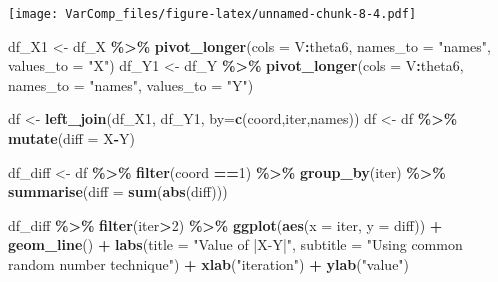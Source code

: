 \documentclass[
]{article}
\newenvironment{Shaded}{\begin{snugshade}}{\end{snugshade}}
\newcommand{\AttributeTok}[1]{\textcolor[rgb]{0.13,0.29,0.53}{#1}}
\newcommand{\DecValTok}[1]{\textcolor[rgb]{0.00,0.00,0.81}{#1}}
\newcommand{\FunctionTok}[1]{\textcolor[rgb]{0.13,0.29,0.53}{\textbf{#1}}}
\newcommand{\NormalTok}[1]{#1}
\newcommand{\OtherTok}[1]{\textcolor[rgb]{0.56,0.35,0.01}{#1}}
\newcommand{\SpecialCharTok}[1]{\textcolor[rgb]{0.81,0.36,0.00}{\textbf{#1}}}
\newcommand{\StringTok}[1]{\textcolor[rgb]{0.31,0.60,0.02}{#1}}
\begin{document}
\texttt{[image: VarComp\_files/figure-latex/unnamed-chunk-8-4.pdf]}

\begin{Shaded}
\begin{Highlighting}[]
\NormalTok{df\_X1 }\OtherTok{\textless{}{-}}\NormalTok{ df\_X }\SpecialCharTok{\%\textgreater{}\%} \FunctionTok{pivot\_longer}\NormalTok{(}\AttributeTok{cols =}\NormalTok{ V}\SpecialCharTok{:}\NormalTok{theta6, }\AttributeTok{names\_to =} \StringTok{"names"}\NormalTok{, }\AttributeTok{values\_to =} \StringTok{"X"}\NormalTok{)}
\NormalTok{df\_Y1 }\OtherTok{\textless{}{-}}\NormalTok{ df\_Y }\SpecialCharTok{\%\textgreater{}\%} \FunctionTok{pivot\_longer}\NormalTok{(}\AttributeTok{cols =}\NormalTok{ V}\SpecialCharTok{:}\NormalTok{theta6, }\AttributeTok{names\_to =} \StringTok{"names"}\NormalTok{, }\AttributeTok{values\_to =} \StringTok{"Y"}\NormalTok{)}

\NormalTok{df }\OtherTok{\textless{}{-}} \FunctionTok{left\_join}\NormalTok{(df\_X1, df\_Y1, }\AttributeTok{by=}\FunctionTok{c}\NormalTok{(}\StringTok{\textquotesingle{}coord\textquotesingle{}}\NormalTok{,}\StringTok{\textquotesingle{}iter\textquotesingle{}}\NormalTok{,}\StringTok{\textquotesingle{}names\textquotesingle{}}\NormalTok{))}
\NormalTok{df }\OtherTok{\textless{}{-}}\NormalTok{ df }\SpecialCharTok{\%\textgreater{}\%} \FunctionTok{mutate}\NormalTok{(}\AttributeTok{diff =}\NormalTok{ X}\SpecialCharTok{{-}}\NormalTok{Y)}

\NormalTok{df\_diff }\OtherTok{\textless{}{-}}\NormalTok{ df }\SpecialCharTok{\%\textgreater{}\%}
  \FunctionTok{filter}\NormalTok{(coord }\SpecialCharTok{==}\DecValTok{1}\NormalTok{) }\SpecialCharTok{\%\textgreater{}\%}
  \FunctionTok{group\_by}\NormalTok{(iter) }\SpecialCharTok{\%\textgreater{}\%}
  \FunctionTok{summarise}\NormalTok{(}\AttributeTok{diff =} \FunctionTok{sum}\NormalTok{(}\FunctionTok{abs}\NormalTok{(diff)))}
\end{Highlighting}
\end{Shaded}

\begin{Shaded}
\begin{Highlighting}[]
\NormalTok{df\_diff }\SpecialCharTok{\%\textgreater{}\%}
  \FunctionTok{filter}\NormalTok{(iter}\SpecialCharTok{\textgreater{}}\DecValTok{2}\NormalTok{) }\SpecialCharTok{\%\textgreater{}\%}
  \FunctionTok{ggplot}\NormalTok{(}\FunctionTok{aes}\NormalTok{(}\AttributeTok{x =}\NormalTok{ iter, }\AttributeTok{y =}\NormalTok{ diff)) }\SpecialCharTok{+}
  \FunctionTok{geom\_line}\NormalTok{() }\SpecialCharTok{+} \FunctionTok{labs}\NormalTok{(}\AttributeTok{title =} \StringTok{"Value of |X{-}Y|"}\NormalTok{, }\AttributeTok{subtitle =} \StringTok{"Using common random number technique"}\NormalTok{) }\SpecialCharTok{+}
  \FunctionTok{xlab}\NormalTok{(}\StringTok{"iteration"}\NormalTok{) }\SpecialCharTok{+} \FunctionTok{ylab}\NormalTok{(}\StringTok{"value"}\NormalTok{)}
\end{Highlighting}
\end{Shaded}
\end{document}

